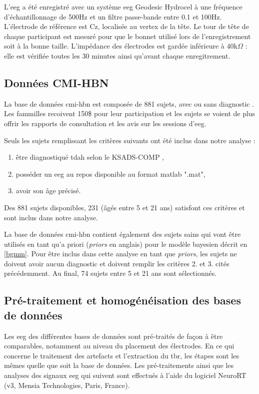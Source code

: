 L'\gls{eeg} a été enregistré avec un système \gls{eeg} Geodesic Hydrocel à une fréquence d'échantillonnage de 500Hz et un filtre passe-bande entre 0.1 et 100Hz. 
L'électrode de référence est Cz, localisée au vertex de la tête. Le tour de tête de chaque participant est mesuré pour que le bonnet utilisé lors de l'enregistrement 
soit à la bonne taille. L'impédance des électrodes est gardée inférieure à $40$k$\Omega$ : elle est vérifiée toutes les 30 minutes ainsi qu'avant chaque enregitrement.

\subsection{Données CMI-HBN}
La base de données \gls{cmi-hbn} est composée de 881 sujets, avec ou sans diagnostic \citep{Alexander2017, Alexander2017b}. Les fammilles recoivent 150\$ pour leur participation 
et les sujets se voient de plus offrir les rapports de consultation et les avis sur les sessions d'\gls{eeg}.

Seuls les sujets remplissant les critères suivants ont été inclus dans notre analyse :
\begin{enumerate}
\item être diagnostiqué \gls{tdah} selon le KSADS-COMP \citep{Kaufman1997},
\item posséder un \gls{eeg} au repos disponible au format matlab ".mat",
\item avoir son âge précisé.
\end{enumerate}

Des 881 sujets disponibles, 231 (âgés entre 5 et 21 ans) satisfont ces critères et sont inclus dans notre analyse.

La base de données \gls{cmi-hbn} contient également des sujets sains qui vont être utilisés en tant qu'a priori (\textit{priors} en anglais) pour le
modèle bayesien décrit en \ref{bgmm}. Pour être inclus dans cette analyse en tant que \textit{priors}, les sujets ne doivent avoir aucun diagnostic 
et doivent remplir les critères 2. et 3. cités précédemment. Au final, 74 sujets entre 5 et 21 ans sont sélectionnés. 

\subsection{Pré-traitement et homogénéisation des bases de données}
Les \gls{eeg} des différentes bases de données sont pré-traités de façon à être comparables, notamment au niveau du placement des électrodes.
En ce qui concerne le traitement des artefacts et l'extraction du \gls{tbr}, les étapes sont les mêmes quelle que soit la base de données. 
Les pré-traitements ainsi que les analyses des signaux \gls{eeg} qui suivent sont effectués à l'aide du logiciel NeuroRT (v3, Mensia Technologies, 
Paris, France).

